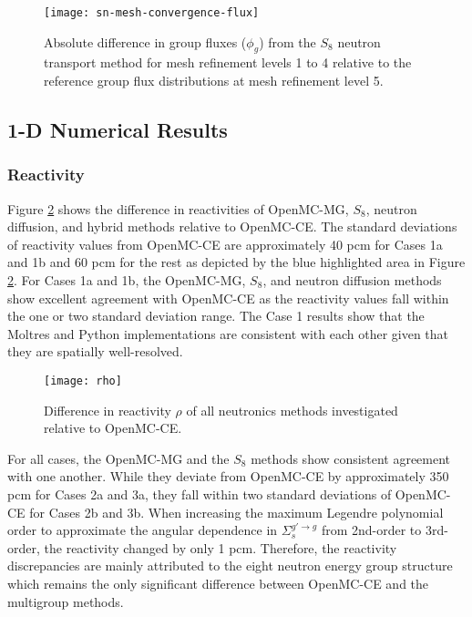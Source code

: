 \begin{figure}[htb!]
  \centering
  \texttt{[image: sn-mesh-convergence-flux]}
  \caption{Absolute difference in group fluxes ($\phi_g$) from the $S_8$ neutron transport method
  for mesh refinement levels 1 to 4 relative to the reference group flux distributions at mesh
  refinement level 5.}
  \label{fig:sn-mesh-flux}
\end{figure}

\FloatBarrier

\subsection{1-D Numerical Results}

\subsubsection{Reactivity}

Figure \ref{fig:1d-rho} shows the difference in reactivities of OpenMC-MG, $S_8$,
neutron diffusion, and hybrid methods relative to OpenMC-CE. The standard deviations of
reactivity values from OpenMC-CE are approximately 40 pcm for Cases 1a and 1b and 60 pcm for the
rest as depicted by the blue highlighted area in Figure \ref{fig:1d-rho}. For Cases 1a and 1b, the
OpenMC-MG, $S_8$, and neutron diffusion methods show excellent agreement with OpenMC-CE as the
reactivity values fall within the one or two standard deviation range. The Case 1 results show that
the Moltres and Python implementations are consistent with each other given that they are spatially
well-resolved.

\begin{figure}[htb!]
  \centering
  \texttt{[image: rho]}
  \caption{Difference in reactivity $\rho$ of all neutronics methods investigated relative
  to OpenMC-CE.}
  \label{fig:1d-rho}
\end{figure}

For all cases, the OpenMC-MG and the $S_8$ methods show consistent agreement with one another. 
While they deviate from OpenMC-CE by approximately 350 pcm for Cases 2a and 3a, they fall within
two standard deviations of OpenMC-CE for Cases 2b and 3b. When increasing the maximum Legendre
polynomial order to approximate the angular dependence in $\Sigma_s^{g'\rightarrow g}$ from
2nd-order to 3rd-order, the reactivity changed by only 1 pcm. Therefore, the reactivity
discrepancies are mainly attributed to the eight neutron energy group structure which remains the
only significant difference between OpenMC-CE and the multigroup methods.

